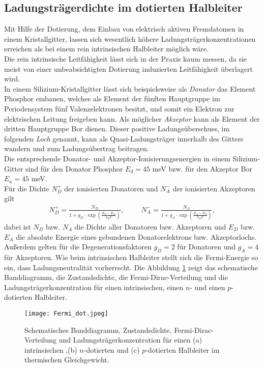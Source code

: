 \subsection{Ladungsträgerdichte im dotierten Halbleiter}
Mit Hilfe der Dotierung, dem Einbau von elektrisch aktiven Fremdatomen in einem Kristallgitter, lassen sich wesentlich höhere Ladungsträgerkonzentrationen erreichen als bei einem rein intrinsischen Halbleiter möglich wäre.\\
Die rein intrinsische Leitfähigkeit lässt sich in der Praxis kaum messen, da sie meist von einer unbeabsichtigten Dotierung induzierten Leitfähigkeit überlagert wird.\\
In einem Silizium-Kristallgitter lässt sich beispielsweise als \emph{Donator} das Element Phosphor einbauen, welches als Element der fünften Hauptgruppe im Periodensystem fünf Valenzelektronen besitzt, und somit ein Elektron zur elektrischen Leitung freigeben kann. Als möglicher \emph{Akzeptor} kann als Element der dritten Hauptgruppe Bor dienen. Dieser positive Ladungsüberschuss, im folgenden \emph{Loch} genannt, kann als Quasi-Ladungsträger innerhalb des Gitters wandern und zum Ladungsübertrag beitragen.\\
Die entsprechende Donator- und Akzeptor-Ionisierungsenergien in einem Silizium-Gitter sind für den Donator Phosphor $E_d=45$ meV bzw. für den Akzeptor Bor $E_a=45$ meV.\\
Für die Dichte $N_D^{+}$ der ionisierten Donatoren und $N_A^{-}$ der ionisierten Akzeptoren gilt
\begin{align}
N_D^{+}=\frac{N_D}{1+g_D\cdot\exp\left(\frac{E_F-E_D}{k_B T}\right)},\hspace{1cm}N_A^{-}=\frac{N_A}{1+g_A\cdot\exp\left(\frac{E_A-E_F}{k_B T}\right)},
\label{eq:don_acc_density}
\end{align}
dabei ist $N_D$ bzw. $N_A$ die Dichte aller Donatoren bzw. Akzeptoren und $E_D$ bzw. $E_A$ die absolute Energie eines gebundenen Donatorelektrons bzw. Akzeptorlochs. Außerdem gelten für die Degenerationsfaktoren $g_D=2$ für Donatoren und $g_A=4$ für Akzeptoren. Wie beim intrinsischen Halbleiter stellt sich die Fermi-Energie so ein, dass Ladungsneutralität vorherrscht. Die Abbildung \ref{fig:fermi_dot} zeigt das schematische Banddiagramm, die Zustandsdichte, die Fermi-Dirac-Verteilung und die Ladungsträgerkonzentration für einen intrinsischen, einen $n$- und einen $p$-dotierten Halbleiter.\\
\begin{figure}
\centering
\texttt{[image: Fermi\_dot.jpeg]}
\caption[Banddiagramm, Zustandsdichte, Fermi-Dirac-Verteilung, Ladungsträgerkonzentration]
{Schematisches Banddiagramm, Zustandsdichte, Fermi-Dirac-Verteilung und Ladungsträgerkonzentration für einen (a) intrinsischen ,(b) $n$-dotierten und (c) $p$-dotierten Halbleiter im thermischen Gleichgewicht. \cite{lit:Sze07}}
\label{fig:fermi_dot}
\end{figure}
